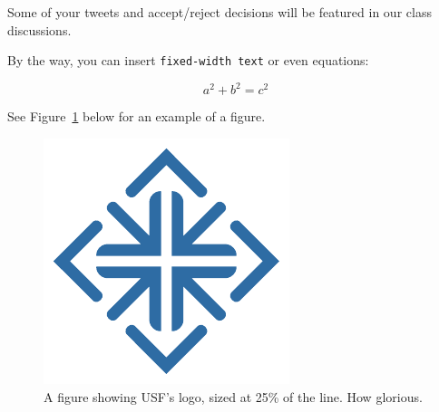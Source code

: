 \documentclass[notitlepage,12pt]{article}
\begin{document}
\noindent Some of your tweets and accept/reject decisions will be featured in our class discussions.

By the way, you can insert \texttt{fixed-width text} or even equations:

\begin{equation}
    \label{simple_equation}
    a^2 + b^2 = c^2
\end{equation}

\noindent See Figure~\ref{fig:usf-logo} below for an example of a figure.

\begin{figure}[h!] %
    \centering

    \includegraphics[width=0.15\linewidth]{usf-blue.pdf}
    \caption{A figure showing USF's logo, sized at 25\% of the line. How glorious.}
    \label{fig:usf-logo}
\end{figure}


 
\end{document}
